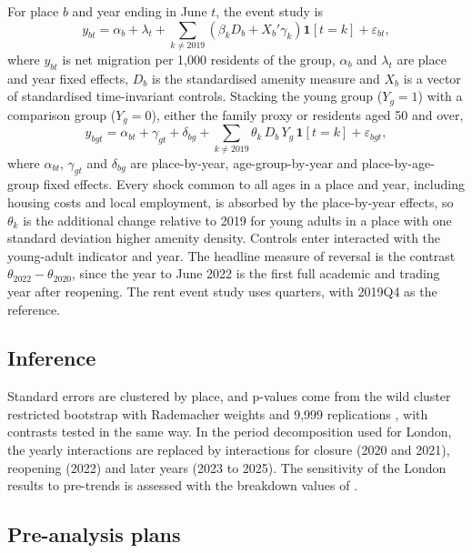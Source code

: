 \documentclass[11pt,a4paper]{article}
\begin{document}
For place $b$ and year ending in June $t$, the event study is
\begin{equation}\label{eq:es}
y_{bt} = \alpha_b + \lambda_t + \sum_{k \neq 2019} \left( \beta_k D_b + X_b' \gamma_k \right) \mathbf{1}[t = k] + \varepsilon_{bt},
\end{equation}
where $y_{bt}$ is net migration per 1,000 residents of the group, $\alpha_b$ and $\lambda_t$ are place and year fixed effects, $D_b$ is the standardised amenity measure and $X_b$ is a vector of standardised time-invariant controls. Stacking the young group ($Y_g = 1$) with a comparison group ($Y_g = 0$), either the family proxy or residents aged 50 and over,
\begin{equation}\label{eq:ddd}
y_{bgt} = \alpha_{bt} + \gamma_{gt} + \delta_{bg} + \sum_{k \neq 2019} \theta_k \, D_b \, Y_g \, \mathbf{1}[t = k] + \varepsilon_{bgt},
\end{equation}
where $\alpha_{bt}$, $\gamma_{gt}$ and $\delta_{bg}$ are place-by-year, age-group-by-year and place-by-age-group fixed effects. Every shock common to all ages in a place and year, including housing costs and local employment, is absorbed by the place-by-year effects, so $\theta_k$ is the additional change relative to 2019 for young adults in a place with one standard deviation higher amenity density. Controls enter interacted with the young-adult indicator and year. The headline measure of reversal is the contrast $\theta_{2022} - \theta_{2020}$, since the year to June 2022 is the first full academic and trading year after reopening. The rent event study uses quarters, with 2019Q4 as the reference.

\subsection{Inference}

Standard errors are clustered by place, and p-values come from the wild cluster restricted bootstrap with Rademacher weights and 9,999 replications \citep{cameron2008,mackinnon2018,roodman2019}, with contrasts tested in the same way. In the period decomposition used for London, the yearly interactions are replaced by interactions for closure (2020 and 2021), reopening (2022) and later years (2023 to 2025). The sensitivity of the London results to pre-trends is assessed with the breakdown values of \citet{rambachan2023}.

\subsection{Pre-analysis plans}\label{sec:pap}
\end{document}
